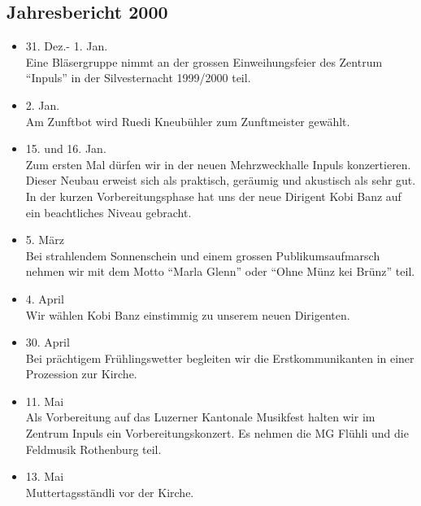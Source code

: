 \subsection{Jahresbericht 2000}

\begin{history}


    \begin{itemize}

        \item[]31. Dez.- 1. Jan.\\
        Eine Bläsergruppe nimmt an der grossen Einweihungsfeier des Zentrum
        \enquote{Inpuls} in der Silvesternacht 1999/2000 teil.

        \item[]2. Jan.\\
        Am Zunftbot wird Ruedi Kneubühler zum Zunftmeister gewählt.

        \item[]15. und 16. Jan.\\
        Zum ersten Mal dürfen wir in der neuen Mehrzweckhalle Inpuls
        konzertieren. Dieser Neubau erweist sich als praktisch, geräumig und
        akustisch als sehr gut. In der kurzen Vorbereitungsphase hat uns der
        neue Dirigent Kobi Banz auf ein beachtliches Niveau gebracht.

        \item[]5. März\\
        Bei strahlendem Sonnenschein und einem grossen Publikumsaufmarsch nehmen
        wir mit dem Motto \enquote{Marla Glenn} oder \enquote{Ohne Münz kei
            Brünz} teil.

        \item[]4. April\\
        Wir wählen Kobi Banz einstimmig zu unserem neuen Dirigenten.

        \item[]30. April\\
        Bei prächtigem Frühlingswetter begleiten wir die Erstkommunikanten in
        einer Prozession zur Kirche.

        \item[]11. Mai\\
        Als Vorbereitung auf das Luzerner Kantonale Musikfest halten wir im
        Zentrum Inpuls ein Vorbereitungskonzert. Es nehmen die MG Flühli und die
        Feldmusik Rothenburg teil.

        \item[]13. Mai\\
        Muttertagsständli vor der Kirche.


\end{itemize}
\end{history}
